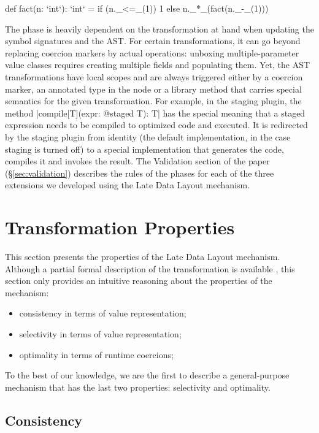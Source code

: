 \begin{lstlisting-nobreak}
 def fact(n: `int`): `int` =
   if (n._<=_(1))
     1
   else
     n._*_(fact(n._-_(1)))
\end{lstlisting-nobreak}

The \commit{} phase is heavily dependent on the transformation at hand when updating the symbol signatures and the AST. For certain transformations, it can go beyond replacing coercion markers by actual operations: unboxing multiple-parameter value classes requires creating multiple fields and populating them. Yet, the AST transformations have local scopes and are always triggered either by a coercion marker, an annotated type in the node or a library method that carries special semantics for the given transformation. For example, in the staging plugin, the method |compile[T](expr: @staged T): T| has the special meaning that a staged expression needs to be compiled to optimized code and executed. It is redirected by the staging plugin from identity (the default implementation, in the case staging is turned off) to a special implementation that generates the code, compiles it and invokes the result. The Validation section of the paper (\S\ref{sec:validation}) describes the rules of the \commit{} phases for each of the three extensions we developed using the Late Data Layout mechanism.

\section{Transformation Properties}
\label{sec:transform-props}

This section presents the properties of the Late Data Layout mechanism. Although a partial formal description of the transformation is available \cite{ldl-form}, this section only provides an intuitive reasoning about the properties of the mechanism:

\begin{itemize}
\item consistency in terms of value representation;
\item selectivity in terms of value representation;
\item optimality in terms of runtime coercions;
\end{itemize}

To the best of our knowledge, we are the first to describe a general-purpose mechanism that has the last two properties: selectivity and optimality.

\subsection{Consistency}

